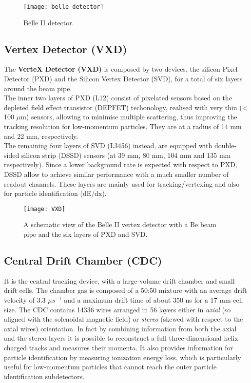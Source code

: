 \begin{figure}[h!]
\centering
\texttt{[image: belle\_detector]}
\caption{Belle II detector.}
\label{fig:belle_detector}
\end{figure}


\subsection{Vertex Detector (VXD)}


The \textbf{VerteX Detector (VXD)} is composed by two devices, the silicon Pixel Detector (PXD) and the Silicon Vertex Detector (SVD), for a total of six layers around the beam pipe.\\
The inner two layers of PXD (L12) consist of pixelated sensors based on the depleted field effect transistor (DEPFET) techonology, realised with very thin (< 100 $\mu$m) sensors, allowing to minimise multiple scattering, thus improving the tracking resolution for low-momentum particles. They are at a radius of 14 mm and 22 mm, respectively. \\
The remaining four layers of SVD (L3456) instead, are equipped with double-sided silicon strip (DSSD) sensors (at 39 mm, 80 mm, 104 mm and 135 mm respectively). Since a lower background rate is expected with respect to PXD, DSSD allow to achieve similar performance with a much smaller number of readout channels.
These layers are mainly used for tracking/vertexing and also for particle identification (dE/dx). 

\begin{figure}[h!]
\centering
\texttt{[image: VXD]}
\caption{A schematic view of the Belle II vertex detector with a Be beam pipe and the six layers of PXD and SVD.}
\label{fig:VXD}
\end{figure}


\subsection{Central Drift Chamber (CDC)}

It is the central tracking device, with a large-volume drift chamber and small drift cells. The chamber gas is composed of a  50:50 mixture with an average drift velocity of 3.3 $\mu s^{-1}$ and a maximum drift time of about 350 ns for a 17 mm cell size.
The CDC contains 14336 wires  arranged in 56 layers either in \textit{axial}  (so aligned with the solenoidal magnetic field) or \textit{stereo} (skewed with respect to the axial wires) orientation. In fact by combining information from both the axial and the stereo layers it is possible to reconstruct a full three-dimensional helix charged tracks and measures their momenta.
It also provides information for particle identification by measuring ionization energy loss, which is particularly useful for low-momentum particles that cannot reach the outer particle identification subdetectors.

